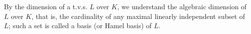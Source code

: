 By the dimension of a t.v.s. $L$ over $K$, we understand the algebraic dimension of $L$ over $K$, that is, the cardinality of any maximal linearly independent subset of $L$; such a set is called a basis (or Hamel basis) of $L$.
